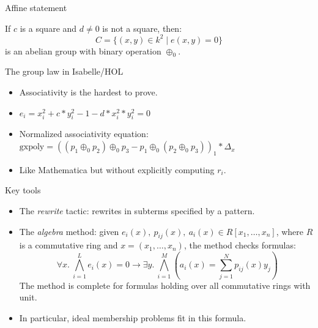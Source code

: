 \documentclass[10pt]{beamer}
\begin{document}
\begin{frame}{Affine statement}
\begin{theorem}
	If $c$ is a square and $
	d \neq 0$ is not a square, then:  
	\[
	C= \{(x,y)\in k^2 \mid  e(x,y) = 0\}
	\]
	is an abelian group with binary operation $\oplus_0$.
\end{theorem}
\end{frame}

\begin{frame}{The group law in Isabelle/HOL}
\begin{itemize}
\item Associativity is the hardest to prove. 
\item $
e_i = x_i^2 + c *
y_i^2 - 1 - d * x_i^2 * y_i^2 = 0
$
\item Normalized associativity equation: $
\text{gxpoly} = ((p_1 \oplus_0 p_2)
\oplus_0 p_3 - p_1 \oplus_0 (p_2 \oplus_0 p_3))_1*\Delta_x
$

\end{itemize}
\vspace{0.5cm}


\begin{itemize}
	\item Like Mathematica but without explicitly computing $r_i$.
\end{itemize}
\end{frame}

\begin{frame}{Key tools}
\begin{itemize}
	\item The \emph{rewrite} tactic: rewrites in subterms specified by a pattern.
	
	\item The \textit{algebra} method: given
	$e_i(x),\ p_{ij}(x),\ a_i(x) \in R[x_1,\ldots,x_n]$, where $R$ is a
	commutative ring and $x=(x_1,\ldots,x_n)$, the method checks formulas:
	\[
	\; \forall x.\ \bigwedge_{i = 1}^L
	e_i({x}) = 0 \to \exists{y}.\ \bigwedge_{i = 1}^M
	\left(a_i(x) = \sum_{j = 1}^N p_{ij}({x}) y_j \right)
	\] 
	The method is complete for formulas holding over all commutative rings with unit.
	
	\item In particular, ideal membership problems fit in this formula.
\end{itemize}
\end{frame}
\end{document}
